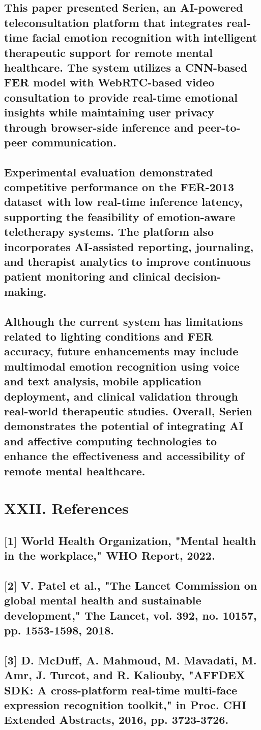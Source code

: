 \documentclass[conference]{IEEEtran}
\begin{document}
\subsection{This paper presented Serien, an AI-powered teleconsultation platform that integrates real-time facial emotion recognition with intelligent therapeutic support for remote mental healthcare. The system utilizes a CNN-based FER model with WebRTC-based video consultation to provide real-time emotional insights while maintaining user privacy through browser-side inference and peer-to-peer communication.}
\subsection{Experimental evaluation demonstrated competitive performance on the FER-2013 dataset with low real-time inference latency, supporting the feasibility of emotion-aware teletherapy systems. The platform also incorporates AI-assisted reporting, journaling, and therapist analytics to improve continuous patient monitoring and clinical decision-making.}
\subsection{Although the current system has limitations related to lighting conditions and FER accuracy, future enhancements may include multimodal emotion recognition using voice and text analysis, mobile application deployment, and clinical validation through real-world therapeutic studies. Overall, Serien demonstrates the potential of integrating AI and affective computing technologies to enhance the effectiveness and accessibility of remote mental healthcare.}
\section{XXII. References}
\subsection{[1] World Health Organization, "Mental health in the workplace," WHO Report, 2022.}
\subsection{[2] V. Patel et al., "The Lancet Commission on global mental health and sustainable development," The Lancet, vol. 392, no. 10157, pp. 1553-1598, 2018.}
\subsection{[3] D. McDuff, A. Mahmoud, M. Mavadati, M. Amr, J. Turcot, and R. Kaliouby, "AFFDEX SDK: A cross-platform real-time multi-face expression recognition toolkit," in Proc. CHI Extended Abstracts, 2016, pp. 3723-3726.}
\end{document}
